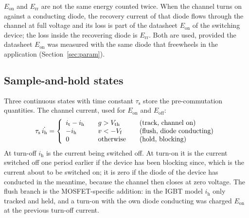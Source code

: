 \documentclass[11pt,a4paper]{article}
\newcommand{\Eon}{E_{\mathrm{on}}}
\newcommand{\Eoff}{E_{\mathrm{off}}}
\newcommand{\Err}{E_{\mathrm{rr}}}
\newcommand{\ih}{i_{\mathrm{h}}}
\newcommand{\taus}{\tau_{\mathrm{s}}}
\begin{document}
$\Eon$ and $\Err$ are not the same energy counted twice. When the channel turns
on against a conducting diode, the recovery current of that diode flows
through the channel at full voltage and its loss is part of the datasheet
$\Eon$ of the switching device; the loss inside the recovering diode is
$\Err$. Both are used, provided the datasheet $\Eon$ was measured with the
same diode that freewheels in the application (Section~\ref{sec:param}).

\subsection{Sample-and-hold states}
\label{sec:sh}

Three continuous states with time constant $\taus$ store the pre-commutation
quantities. The channel current, used for $\Eon$ and $\Eoff$:
\begin{equation}
\taus\,\dot{\ih} =
\left\{\begin{array}{l@{\qquad}l@{\qquad}l}
 i_\mathrm{t} - \ih & g > V_\mathrm{th} & \text{(track, channel on)} \\
 -\ih              & v < -V_\mathrm{f} & \text{(flush, diode conducting)} \\
 0                 & \text{otherwise}   & \text{(hold, blocking)}
\end{array}\right.
\label{eq:ih}
\end{equation}
At turn-off $\ih$ is the current being switched off. At turn-on it is the
current switched off one period earlier if the device has been blocking since,
which is the current about to be switched on; it is zero if the diode of the
device has conducted in the meantime, because the channel then closes at
zero voltage. The flush branch is the MOSFET-specific addition: in the IGBT
model $\ih$ only tracked and held, and a turn-on with the own diode conducting
was charged $\Eon$ at the previous turn-off current.
\end{document}
